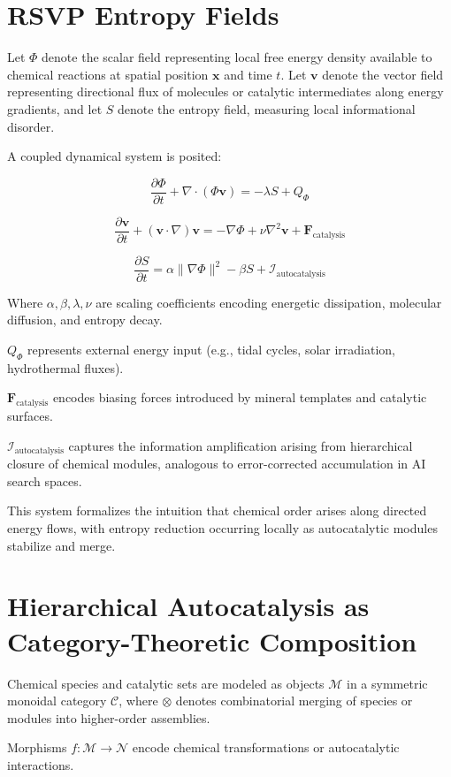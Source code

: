 \documentclass{book}
\begin{document}
\section{RSVP Entropy Fields}
Let $\Phi$ denote the scalar field representing local free energy density available to chemical reactions at spatial position $\mathbf{x}$ and time $t$. Let $\mathbf{v}$ denote the vector field representing directional flux of molecules or catalytic intermediates along energy gradients, and let $S$ denote the entropy field, measuring local informational disorder.

A coupled dynamical system is posited:

\[\frac{\partial \Phi}{\partial t} + \nabla \cdot (\Phi \mathbf{v}) = - \lambda S + Q_\Phi\]

\[\frac{\partial \mathbf{v}}{\partial t} + (\mathbf{v} \cdot \nabla) \mathbf{v} = - \nabla \Phi + \nu \nabla^2 \mathbf{v} + \mathbf{F}_{\text{catalysis}}\]

\[\frac{\partial S}{\partial t} = \alpha \|\nabla \Phi\|^2 - \beta S + \mathcal{I}_{\text{autocatalysis}}\]

Where $\alpha, \beta, \lambda, \nu$ are scaling coefficients encoding energetic dissipation, molecular diffusion, and entropy decay.

$Q_\Phi$ represents external energy input (e.g., tidal cycles, solar irradiation, hydrothermal fluxes).

$\mathbf{F}_{\text{catalysis}}$ encodes biasing forces introduced by mineral templates and catalytic surfaces.

$\mathcal{I}_{\text{autocatalysis}}$ captures the information amplification arising from hierarchical closure of chemical modules, analogous to error-corrected accumulation in AI search spaces.

This system formalizes the intuition that chemical order arises along directed energy flows, with entropy reduction occurring locally as autocatalytic modules stabilize and merge.

\section{Hierarchical Autocatalysis as Category-Theoretic Composition}
Chemical species and catalytic sets are modeled as objects $\mathcal{M}$ in a symmetric monoidal category $\mathcal{C}$, where $\otimes$ denotes combinatorial merging of species or modules into higher-order assemblies.

Morphisms $f: \mathcal{M} \to \mathcal{N}$ encode chemical transformations or autocatalytic interactions.
\end{document}
